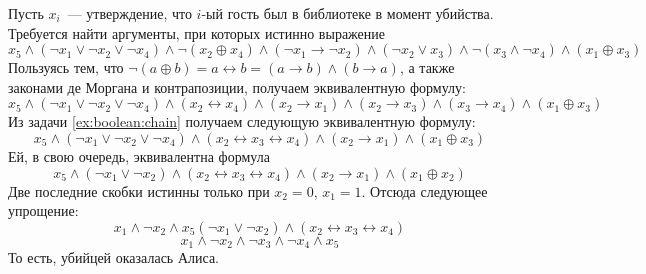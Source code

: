 \begin{Answer}
    \noindent
    Пусть $ x_i $~--- утверждение, что $ i $-ый гость был в библиотеке в момент убийства.
    Требуется найти аргументы, при которых истинно выражение
    \[
        x_5 \wedge (\neg x_1 \vee \neg x_2 \vee \neg x_4 ) \wedge \neg (x_2 \oplus x_4) \wedge
        (\neg x_1 \rightarrow \neg x_2) \wedge (\neg x_2 \vee x_3) \wedge \neg (x_3 \wedge \neg x_4) \wedge (x_1 \oplus x_3)
    \]
    Пользуясь тем, что $ \neg (a \oplus b) = a \leftrightarrow b = (a \rightarrow b) \wedge (b \rightarrow a) $, а также законами де Моргана и контрапозиции,
    получаем эквивалентную формулу:
    \[
        x_5 \wedge (\neg x_1 \vee \neg x_2 \vee \neg x_4 ) \wedge (x_2 \leftrightarrow x_4) \wedge (x_2 \rightarrow x_1) \wedge (x_2 \rightarrow x_3) \wedge
        (x_3 \rightarrow x_4) \wedge (x_1 \oplus x_3)
    \]
    Из задачи \ref{ex:boolean:chain} получаем следующую эквивалентную формулу:
    \[
        x_5 \wedge (\neg x_1 \vee \neg x_2 \vee \neg x_4 ) \wedge (x_2 \leftrightarrow x_3 \leftrightarrow x_4) \wedge (x_2 \rightarrow x_1) \wedge (x_1 \oplus x_3)
    \]
    Ей, в свою очередь, эквивалентна формула
    \[
        x_5 \wedge (\neg x_1 \vee \neg x_2 ) \wedge (x_2 \leftrightarrow x_3 \leftrightarrow x_4) \wedge (x_2 \rightarrow x_1) \wedge (x_1 \oplus x_2)
    \]
    Две последние скобки истинны только при $ x_2 = 0 $, $ x_1 = 1 $.
    Отсюда следующее упрощение:
    \[
        x_1 \wedge \neg x_2 \wedge x_5 (\neg x_1 \vee \neg x_2 ) \wedge (x_2 \leftrightarrow x_3 \leftrightarrow x_4)
    \]
    \[
        x_1 \wedge \neg x_2 \wedge \neg x_3 \wedge \neg x_4 \wedge x_5
    \]
    То есть, убийцей оказалась Алиса.
\end{Answer}


%
